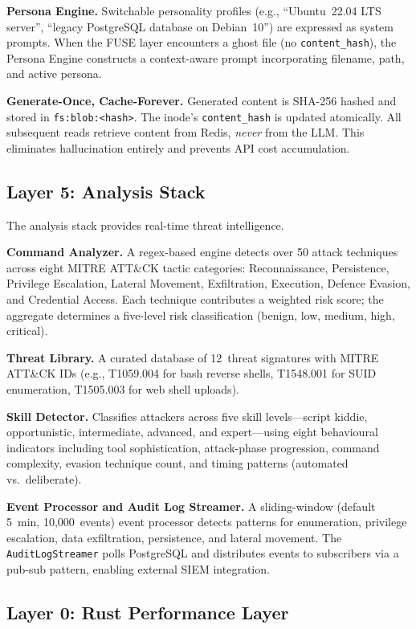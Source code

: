 \documentclass[conference]{IEEEtran}
\begin{document}
\textbf{Persona Engine.}
Switchable personality profiles (e.g., ``Ubuntu~22.04 LTS server'', ``legacy PostgreSQL database on Debian~10'') are expressed as system prompts.
When the FUSE layer encounters a ghost file (no \texttt{content\_hash}), the Persona Engine constructs a context-aware prompt incorporating filename, path, and active persona.

\textbf{Generate-Once, Cache-Forever.}
Generated content is SHA-256 hashed and stored in \texttt{fs:blob:\textless hash\textgreater}.
The inode's \texttt{content\_hash} is updated atomically.
All subsequent reads retrieve content from Redis, \emph{never} from the LLM.
This eliminates hallucination entirely and prevents API cost accumulation.

\subsection{Layer 5: Analysis Stack}

The analysis stack provides real-time threat intelligence.

\textbf{Command Analyzer.}
A regex-based engine detects over 50 attack techniques across eight MITRE ATT\&CK tactic categories: Reconnaissance, Persistence, Privilege Escalation, Lateral Movement, Exfiltration, Execution, Defence Evasion, and Credential Access.
Each technique contributes a weighted risk score; the aggregate determines a five-level risk classification (benign, low, medium, high, critical).

\textbf{Threat Library.}
A curated database of 12~threat signatures with MITRE ATT\&CK IDs (e.g., T1059.004 for bash reverse shells, T1548.001 for SUID enumeration, T1505.003 for web shell uploads).

\textbf{Skill Detector.}
Classifies attackers across five skill levels---script kiddie, opportunistic, intermediate, advanced, and expert---using eight behavioural indicators including tool sophistication, attack-phase progression, command complexity, evasion technique count, and timing patterns (automated vs.\ deliberate).

\textbf{Event Processor and Audit Log Streamer.}
A sliding-window (default 5~min, 10{,}000~events) event processor detects patterns for enumeration, privilege escalation, data exfiltration, persistence, and lateral movement.
The \texttt{AuditLogStreamer} polls PostgreSQL and distributes events to subscribers via a pub-sub pattern, enabling external SIEM integration.

\subsection{Layer 0: Rust Performance Layer}
\end{document}
